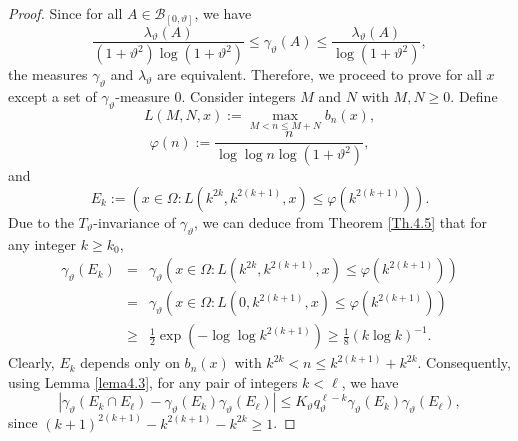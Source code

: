 \documentclass[final,1p,times]{elsarticle}
\numberwithin{equation}{section}
\begin{document}
\begin{proof}
Since for all $A \in \mathcal{B}_{[0, \vartheta]}$, we have
\[
\frac{\lambda_{\vartheta}(A)}{\left( 1+ \vartheta^2\right)\log \left( 1+ \vartheta^2\right)} \leq \gamma_{\vartheta}(A) \leq \frac{\lambda_{\vartheta}(A)}{\log \left( 1+ \vartheta^2\right)},
\]
the measures $\gamma_{\vartheta}$ and $\lambda_{\vartheta}$ are equivalent. Therefore, we proceed to prove for all $x$ except a set of $\gamma_{\vartheta}$-measure $0$. Consider integers $M$ and $N$ with $M, N \geq 0$. Define
\[
L(M, N, x) := \max_{M < n \leq M + N} b_n(x),
\]
\[
\varphi(n) := \frac{n}{\log \log n \log\left( 1+ \vartheta^2\right)},
\]
and
\[
E_k := \left( x \in \Omega : L\left( k^{2k}, k^{2(k+1)}, x\right) \leq \varphi \left(k^{2(k+1)} \right) \right).
\]
Due to the $T_{\vartheta}$-invariance of $\gamma_{\vartheta}$, we can deduce from Theorem \ref{Th.4.5} that for any integer $k \geq k_0$, 
\begin{eqnarray} \label{5.3}
\gamma_{\vartheta}(E_k) &=& \gamma_{\vartheta} \left( x \in \Omega : L\left( k^{2k}, k^{2(k+1)}, x \right) \leq \varphi \left(k^{2(k+1)} \right) \right) \nonumber \\
&=& \gamma_{\vartheta} \left( x \in \Omega : L\left( 0, k^{2(k+1)}, x \right) \leq \varphi \left(k^{2(k+1)} \right) \right) \nonumber \\
&\geq& \frac{1}{2} \exp \left( -\log \log k^{2(k+1)}\right) \geq \frac{1}{8} (k \log k)^{-1}.
\end{eqnarray}
Clearly, $E_k$ depends only on $b_n(x)$ with $k^{2k} < n \leq k^{2(k+1)} + k^{2k}$. Consequently, using Lemma \ref{lema4.3}, for any pair of integers $k < \ell$, we have
\begin{equation*}
 \left| \gamma_{\vartheta}(E_k \cap E_{\ell}) - \gamma_{\vartheta}(E_k) \gamma_{\vartheta}(E_{\ell})\right| \leq K_{\vartheta}q^{\ell-k}_{\vartheta} \gamma_{\vartheta}(E_k) \gamma_{\vartheta}(E_{\ell}),
\end{equation*}
since $(k+1)^{2(k+1)} - k^{2(k+1)} - k^{2k} \geq 1$. 


\end{proof}
\end{document}
